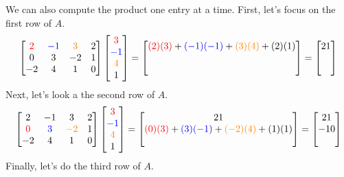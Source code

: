 \documentclass{ximera}
\begin{document}
\begin{exploration}
We can also compute the product one entry at a time.  First, let's focus on the first row of $A$.
$$\begin{bmatrix}{\color{red}2}&{\color{blue}-1}&{\color{orange}3}&2\\0&3&-2&1\\-2&4&1&0\end{bmatrix}\begin{bmatrix}{\color{red}3}\\{\color{blue}-1}\\{\color{orange}4}\\1\end{bmatrix}=\begin{bmatrix}{\color{red}(2)( 3)}+{\color{blue}(-1)(-1)}+{\color{orange}(3)(4)}+(2)(1)\\ \\ \\\end{bmatrix}=\begin{bmatrix}21\\ \\ \\\end{bmatrix}
$$
Next, let's look a the second row of $A$.
$$\begin{bmatrix}2&-1&3&2\\{\color{red}0}&{\color{blue}3}&{\color{orange}-2}&1\\-2&4&1&0\end{bmatrix}\begin{bmatrix}{\color{red}3}\\{\color{blue}-1}\\{\color{orange}4}\\1\end{bmatrix}=\begin{bmatrix}21\\{\color{red}(0)( 3)}+{\color{blue}(3)(-1)}+{\color{orange}(-2)(4)}+(1)(1)\\ \\ \end{bmatrix}=\begin{bmatrix}21\\-10 \\ \\\end{bmatrix}
$$
Finally, let's do the third row of $A$.

\end{exploration}
\end{document}

